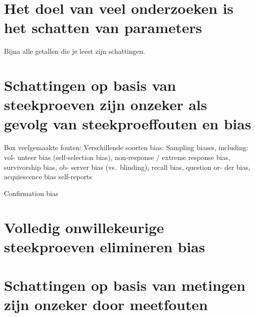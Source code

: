 \documentclass[
  a4paper,
]{scrbook}
\theoremstyle{definition}
\theoremstyle{definition}
\theoremstyle{remark}
\begin{document}
\renewcommand{\vec}[1]{{\boldsymbol #1}}

\providecommand{\cov}[2]{\mathrm{Cov}\!\left(#1, #2\right)}
\providecommand{\var}[1]{\mathrm{Var}\!\left(#1\right)}

\providecommand{\mean}[1]{\overline{#1}}

\providecommand{\sd}[1]{\sigma\left(#1\right)}
\providecommand{\ev}[1]{\mathbb{E}\!\left(#1\right)}
\providecommand{\pr}[1]{\textrm{Pr}\!\left(#1\right)}

\providecommand{\se}[1]{\mathrm{SE}_{#1}}

\providecommand{\ct}[3]{t_{#1 (#2) #3}}

\providecommand{\HO}{H\ped{0}}
\providecommand{\HA}{H\ped{A}}
\providecommand{\df}{\mathrm{df}}

\section{Het doel van veel onderzoeken is het schatten van
parameters}\label{het-doel-van-veel-onderzoeken-is-het-schatten-van-parameters}

Bijna alle getallen die je leest zijn schattingen.

\section{Schattingen op basis van steekproeven zijn onzeker als gevolg
van steekproeffouten en
bias}\label{schattingen-op-basis-van-steekproeven-zijn-onzeker-als-gevolg-van-steekproeffouten-en-bias}

Box veelgemaakte fouten: Verschillende soorten bias: Sampling biases,
including: vol- unteer bias (self-selection bias), non-response /
extreme response bias, survivorship bias, ob- server bias
(vs.~blinding), recall bias, question or- der bias, acquiescence bias
self-reports

Confirmation bias

\section{Volledig onwillekeurige steekproeven elimineren
bias}\label{volledig-onwillekeurige-steekproeven-elimineren-bias}

\section{Schattingen op basis van metingen zijn onzeker door
meetfouten}\label{schattingen-op-basis-van-metingen-zijn-onzeker-door-meetfouten}
\end{document}
